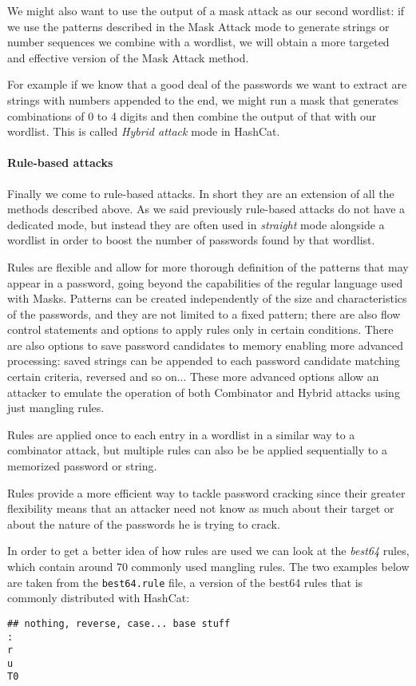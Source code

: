 We might also want to use the output of a mask attack as our second wordlist: if we use the patterns described in the Mask Attack mode to generate strings or number sequences we combine with a wordlist, we will obtain a more targeted and effective version of the Mask Attack method. 

For example if we know that a good deal of the passwords we want to extract are strings with numbers appended to the end, we might run a mask that generates combinations of 0 to 4 digits and then combine the output of that with our wordlist. This is called \emph{Hybrid attack} mode in HashCat.

\paragraph{Rule-based attacks}\label{par:rule-based}
Finally we come to rule-based attacks. In short they are an extension of all the methods described above. 
As we said previously  rule-based attacks do not have a dedicated mode, but instead they are often used in \emph{straight} mode alongside a wordlist in order to boost the number of passwords found by that wordlist.

Rules are flexible and allow for more thorough definition of the patterns that may appear in a password, going beyond the capabilities of the regular language used with Masks.
Patterns can be created independently of the size and characteristics of the passwords, and they are not limited to a fixed pattern; there are also flow control statements and options to apply rules only in certain conditions.
There are also options to save password candidates to memory enabling more advanced processing: saved strings can be appended to each password candidate matching certain criteria, reversed and so on...
These more advanced options allow an attacker to emulate the operation of both Combinator and Hybrid attacks using just mangling rules. 

Rules are applied once to each entry in a wordlist in a similar way to a combinator attack, but multiple rules can also be be applied sequentially to a memorized password or string.

Rules provide a more efficient way to tackle password cracking since their greater flexibility means that an attacker need not know as much about their target or about the nature of the passwords he is trying to crack. 

In order to get a better idea of how rules are used we can look at the \emph{best64} rules, which contain around 70 commonly used mangling rules. The two examples below are taken from the \texttt{best64.rule} file, a version of the best64 rules that is commonly distributed with HashCat:
\begin{verbatim}
## nothing, reverse, case... base stuff
:
r
u
T0
\end{verbatim}

